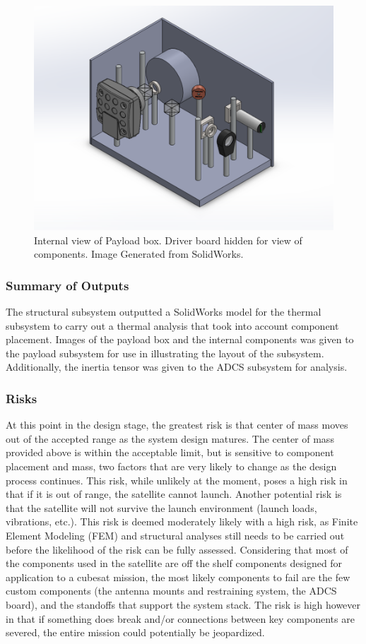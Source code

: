 \documentclass[12pt]{article}
\begin{document}
\begin{figure}[!ht]
\centering
\includegraphics[width=4.5in]{images/STR-11.png}
\caption{Internal view of Payload box. Driver board hidden for view of components. Image Generated from SolidWorks.}
\label{fig:str-11}
\end{figure}

\subsubsection{Summary of Outputs}
The structural subsystem outputted a SolidWorks model for the thermal subsystem to carry out a thermal analysis that took into account component placement.
Images of the payload box and the internal components was given to the payload subsystem for use in illustrating the layout of the subsystem.
Additionally, the inertia tensor was given to the ADCS subsystem for analysis.

\subsubsection{Risks}
At this point in the design stage, the greatest risk is that center of mass moves out of the accepted range as the system design matures. The center of mass provided above is within the acceptable limit, but is sensitive to component placement and mass, two factors that are very likely to change as the design process continues. This risk, while unlikely at the moment, poses a high risk in that if it is out of range, the satellite cannot launch.
Another potential risk is that the satellite will not survive the launch environment (launch loads, vibrations, etc.). This risk is deemed moderately likely with a high risk, as Finite Element Modeling (FEM) and structural analyses still needs to be carried out before the likelihood of the risk can be fully assessed. Considering that most of the components used in the satellite are off the shelf components designed for application to a cubesat mission, the most likely components to fail are the few custom components (the antenna mounts and restraining system, the ADCS board), and the standoffs that support the system stack. The risk is high however in that if something does break and/or connections between key components are severed, the entire mission could potentially be jeopardized.
\end{document}
